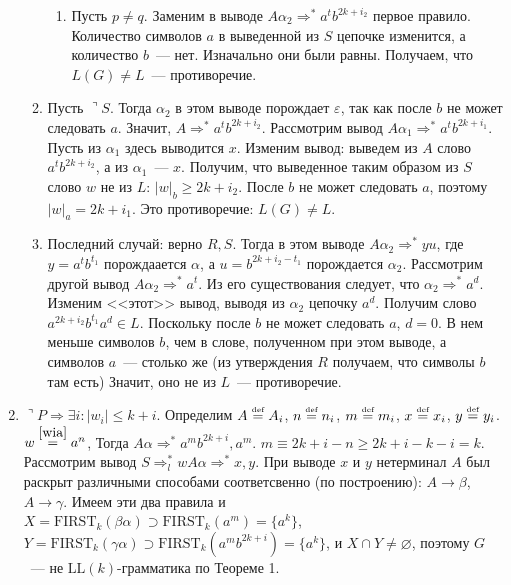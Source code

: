 \documentclass[a4paper]{article}
\def\eqdef{\overset{\mbox{\tiny def}}{=}}
\def\first{\mathrm{ FIRST} }
\def\LL{{\mathrm{LL}}}
\begin{document}
\begin{enumerate}
\begin{enumerate}
\begin{enumerate}
\item Пусть $p\neq q$. Заменим в выводе $A\alpha_2\Rightarrow^* a^tb^{2k+i_2}$ первое правило. Количество символов $a$ в выведенной из $S$ цепочке изменится, а количество $b$~--- нет. Изначально они были равны. Получаем, что $L(G)\neq L$~--- противоречие.
\end{enumerate}
\item Пусть $\urcorner S$. Тогда $\alpha_2$ в этом выводе порождает $\varepsilon$, так как после $b$ не может следовать $a$. Значит, $A\Rightarrow^*a^tb^{2k+i_2}$. Рассмотрим вывод $A\alpha_1\Rightarrow^* a^tb^{2k+i_1}$. Пусть из $\alpha_1$ здесь выводится $x$. Изменим вывод: выведем из $A$ слово $a^tb^{2k+i_2}$, а из $\alpha_1$~--- $x$. Получим, что выведенное таким образом из $S$ слово $w$ не из $L$: $|w|_b\geqslant 2k+i_2$. После $b$ не может следовать $a$, поэтому $|w|_a=2k+i_1$. Это противоречие: $L(G)\neq L$.
\item Последний случай: верно $R, S$. Тогда в этом выводе $A\alpha_2\Rightarrow^* yu$, где $y=a^tb^{t_1}$ порождаается $\alpha$, а $u=b^{2k+i_2-t_1}$ порождается $\alpha_2$. Рассмотрим другой вывод $A\alpha_2\Rightarrow^* a^t$. Из его существования следует, что $\alpha_2\Rightarrow^*a^d$. Изменим <<этот>> вывод, выводя из $\alpha_2$ цепочку $a^d$. Получим слово $a^{2k+i_2}b^{t_1}a^d\in L$. Поскольку после $b$ не может следовать $a$, $d=0$. В нем меньше символов $b$, чем в слове, полученном при этом выводе, а символов $a$~--- столько же (из утверждения $R$ получаем, что символы $b$ там есть) Значит, оно не из $L$~--- противоречие.
\end{enumerate}
\item $\urcorner P\Rightarrow\exists i\colon |w_i|\leqslant k+i$. Определим $A\eqdef A_i$, $n\eqdef n_i$, $m\eqdef m_i$, $x\eqdef x_i$, $y\eqdef y_i$. $w\overset{\ref{wia}}{=}a^n$, Тогда $A\alpha\Rightarrow^* a^{m}b^{2k+i},a^{m}$. $m\equiv 2k+i-n\geqslant 2k+i-k-i=k$. Рассмотрим вывод $S\Rightarrow^*_l wA\alpha\Rightarrow^* x,y$. При выводе $x$ и $y$ нетерминал $A$ был раскрыт различными способами соответсвенно (по построению): $A\to\beta$, $A\to\gamma$. Имеем эти два правила и $X=\first_k(\beta\alpha)\supset \first_k(a^{m})=\{a^k\}$, $Y=\first_k(\gamma\alpha)\supset\first_k(a^{m}b^{2k+i})=\{a^k\}$, и $X\cap Y\neq\varnothing$, поэтому $G$~--- не $\LL(k)$-грамматика по Теореме 1.
\end{enumerate}
\end{document}
